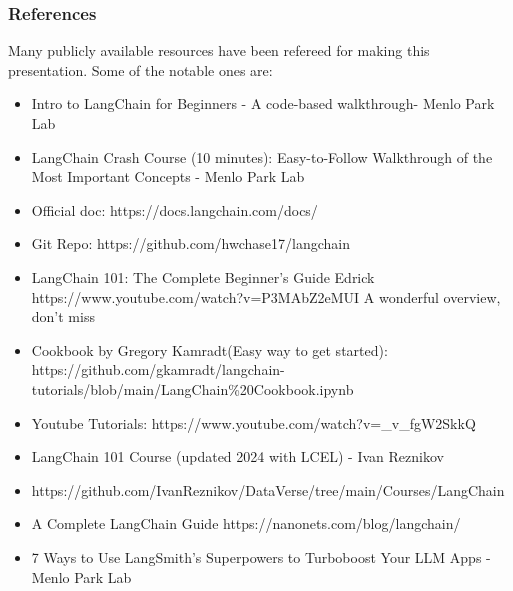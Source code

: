 \begin{frame}\frametitle{References}
Many publicly available resources have been refereed for making this presentation. Some of the notable ones are:
\footnotesize
\begin{itemize}
\item Intro to LangChain for Beginners - A code-based walkthrough- Menlo Park Lab
\item LangChain Crash Course (10 minutes): Easy-to-Follow Walkthrough of the Most Important Concepts - Menlo Park Lab
\item Official doc: https://docs.langchain.com/docs/
\item Git Repo: https://github.com/hwchase17/langchain
\item LangChain 101: The Complete Beginner's Guide Edrick https://www.youtube.com/watch?v=P3MAbZ2eMUI A wonderful overview, don't miss
\item Cookbook by Gregory Kamradt(Easy way to get started): https://github.com/gkamradt/langchain-tutorials/blob/main/LangChain\%20Cookbook.ipynb
\item Youtube Tutorials: https://www.youtube.com/watch?v=\_v\_fgW2SkkQ
\item LangChain 101 Course (updated 2024 with LCEL) - Ivan Reznikov
\item https://github.com/IvanReznikov/DataVerse/tree/main/Courses/LangChain
\item A Complete LangChain Guide https://nanonets.com/blog/langchain/
\item 7 Ways to Use LangSmith's Superpowers to Turboboost Your LLM Apps - Menlo Park Lab
\end{itemize}

\end{frame}